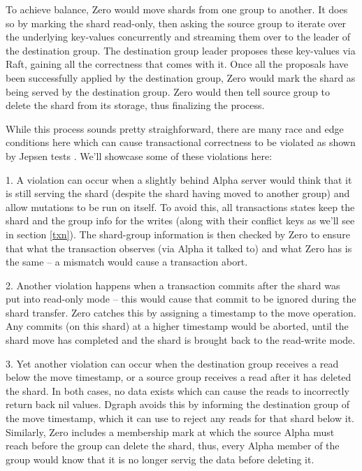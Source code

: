 \documentclass[letterpaper,twocolumn,10pt]{article}
\begin{document}
To achieve balance, Zero would move shards from one group to another. It does so
by marking the shard read-only, then asking the source group to iterate over the
underlying key-values concurrently and streaming them over to the leader of the
destination group. The destination group leader proposes these key-values via
Raft, gaining all the correctness that comes with it. Once all the proposals
have been successfully applied by the destination group, Zero would mark the
shard as being served by the destination group. Zero would then tell source
group to delete the shard from its storage, thus finalizing the process.

While this process sounds pretty straighforward, there are many race and edge
conditions here which can cause transactional correctness to be violated as
shown by Jepsen tests \cite{jepsen}. We'll showcase some of these violations
here:

1. A violation can occur when a slightly behind Alpha server would think that it
is still serving the shard (despite the shard having moved to another group) and
allow mutations to be run on itself. To avoid this, all transactions states keep
the shard and the group info for the writes (along with their conflict keys as
we'll see in section \ref{txn}). The shard-group information is then checked by
Zero to ensure that what the transaction observes (via Alpha it talked to) and
what Zero has is the same -- a mismatch would cause a transaction abort.

2. Another violation happens when a transaction commits after the shard was put
into read-only mode -- this would cause that commit to be ignored during the
shard transfer. Zero catches this by assigning a timestamp to the move
operation. Any commits (on this shard) at a higher timestamp would be aborted,
until the shard move has completed and the shard is brought back to the
read-write mode.

3. Yet another violation can occur when the destination group receives a read
below the move timestamp, or a source group receives a read after it has deleted
the shard. In both cases, no data exists which can cause the reads to
incorrectly return back nil values. Dgraph avoids this by informing the
destination group of the move timestamp, which it can use to reject any reads
for that shard below it. Similarly, Zero includes a membership mark at which
the source Alpha must reach before the group can delete the shard, thus, every
Alpha member of the group would know that it is no longer servig the data before
deleting it.
\end{document}
